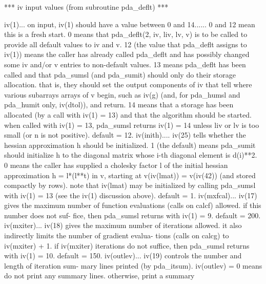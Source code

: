 \documentclass[11pt,twoside,nolof]{starlink}
\begin{document}
\begin{terminalv}
   ***  iv input values (from subroutine pda_deflt)  ***

  iv(1)...  on input, iv(1) should have a value between 0 and 14......
              0 and 12 mean this is a fresh start.  0 means that
                   pda_deflt(2, iv, liv, lv, v)
              is to be called to provide all default values to iv and
              v.  12 (the value that pda_deflt assigns to iv(1)) means the
              caller has already called pda_deflt and has possibly changed
              some iv and/or v entries to non-default values.
              13 means pda_deflt has been called and that pda_sumsl (and
              pda_sumit) should only do their storage allocation.  that is,
              they should set the output components of iv that tell
              where various subarrays arrays of v begin, such as iv(g)
              (and, for pda_humsl and pda_humit only, iv(dtol)), and return.
              14 means that a storage has been allocated (by a call
              with iv(1) = 13) and that the algorithm should be
              started.  when called with iv(1) = 13, pda_sumsl returns
              iv(1) = 14 unless liv or lv is too small (or n is not
              positive).  default = 12.
  iv(inith).... iv(25) tells whether the hessian approximation h should
              be initialized.  1 (the default) means pda_sumit should
              initialize h to the diagonal matrix whose i-th diagonal
              element is d(i)**2.  0 means the caller has supplied a
              cholesky factor  l  of the initial hessian approximation
              h = l*(l**t)  in v, starting at v(iv(lmat)) = v(iv(42))
              (and stored compactly by rows).  note that iv(lmat) may
              be initialized by calling pda_sumsl with iv(1) = 13 (see
              the iv(1) discussion above).  default = 1.
  iv(mxfcal)... iv(17) gives the maximum number of function evaluations
              (calls on calcf) allowed.  if this number does not suf-
              fice, then pda_sumsl returns with iv(1) = 9.  default = 200.
  iv(mxiter)... iv(18) gives the maximum number of iterations allowed.
              it also indirectly limits the number of gradient evalua-
              tions (calls on calcg) to iv(mxiter) + 1.  if iv(mxiter)
              iterations do not suffice, then pda_sumsl returns with
              iv(1) = 10.  default = 150.
  iv(outlev)... iv(19) controls the number and length of iteration sum-
              mary lines printed (by pda_itsum).  iv(outlev) = 0 means do
              not print any summary lines.  otherwise, print a summary

\end{terminalv}
\end{document}
